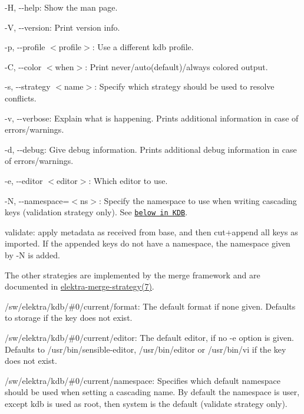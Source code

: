 \begin{DoxyItemize}
\item {\ttfamily -\/H}, {\ttfamily -\/-\/help}\+: Show the man page.
\item {\ttfamily -\/V}, {\ttfamily -\/-\/version}\+: Print version info.
\item {\ttfamily -\/p}, {\ttfamily -\/-\/profile $<$profile$>$}\+: Use a different kdb profile.
\item {\ttfamily -\/C}, {\ttfamily -\/-\/color $<$when$>$}\+: Print never/auto(default)/always colored output.
\item {\ttfamily -\/s}, {\ttfamily -\/-\/strategy $<$name$>$}\+: Specify which strategy should be used to resolve conflicts.
\item {\ttfamily -\/v}, {\ttfamily -\/-\/verbose}\+: Explain what is happening. Prints additional information in case of errors/warnings.
\item {\ttfamily -\/d}, {\ttfamily -\/-\/debug}\+: Give debug information. Prints additional debug information in case of errors/warnings.
\item {\ttfamily -\/e}, {\ttfamily -\/-\/editor $<$editor$>$}\+: Which editor to use.
\item {\ttfamily -\/N}, {\ttfamily -\/-\/namespace}=$<$ns$>$\+: Specify the namespace to use when writing cascading keys ({\ttfamily validation} strategy only). See \href{#KDB}{\tt below in K\+DB}.
\end{DoxyItemize}


\begin{DoxyItemize}
\item {\ttfamily validate}\+: apply metadata as received from base, and then cut+append all keys as imported. If the appended keys do not have a namespace, the namespace given by {\ttfamily -\/N} is added.
\end{DoxyItemize}

The other strategies are implemented by the merge framework and are documented in \hyperlink{doc_help_elektra-merge-strategy_md}{elektra-\/merge-\/strategy(7)}.


\begin{DoxyItemize}
\item {\ttfamily /sw/elektra/kdb/\#0/current/format}\+: The default format if none given. Defaults to {\ttfamily storage} if the key does not exist.
\item {\ttfamily /sw/elektra/kdb/\#0/current/editor}\+: The default editor, if no {\ttfamily -\/e} option is given. Defaults to {\ttfamily /usr/bin/sensible-\/editor}, {\ttfamily /usr/bin/editor} or {\ttfamily /usr/bin/vi} if the key does not exist.
\item {\ttfamily /sw/elektra/kdb/\#0/current/namespace}\+: Specifies which default namespace should be used when setting a cascading name. By default the namespace is user, except {\ttfamily kdb} is used as root, then {\ttfamily system} is the default ({\ttfamily validate} strategy only).
\end{DoxyItemize}

